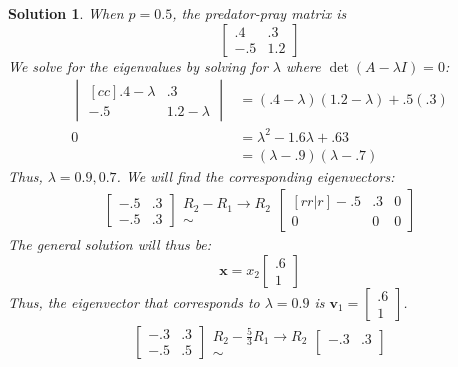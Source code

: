 \documentclass[11pt]{scrartcl}
\theoremstyle{dotlessP}
\newtheorem{sol}{Solution}[section]
\theoremstyle{dotlessN}
\begin{document}
\begin{sol}
	When $p = 0.5$, the predator-pray matrix is
	\[
		\begin{bmatrix}
		.4 & .3 \\
		-.5 & 1.2
		\end{bmatrix}
	\] 
	We solve for the eigenvalues by solving for $\lambda$ where $\det(A - \lambda I) = 0$:
	\begin{align*}
		\begin{vmatrix}[cc]
			.4 - \lambda & .3 \\
			-.5 & 1.2 - \lambda
		\end{vmatrix} &=
		(.4-\lambda)(1.2-\lambda) + .5(.3) \\
		0 &= \lambda^2 -1.6\lambda + .63 \\
		  &= (\lambda - .9)(\lambda - .7)
	\end{align*}
	Thus, $\lambda = 0.9, 0.7$. We will find the corresponding eigenvectors:
	\begin{align*}
		\begin{bmatrix}
		-.5 & .3 \\
		-.5 & .3
		\end{bmatrix}
		\begin{array}{c}
			R_2 - R_1 \to R_2 \\
			\sim
		\end{array}
		\begin{bmatrix}[rr|r]
			-.5 & .3 & 0\\
			0 & 0 & 0
		\end{bmatrix}
	\end{align*}
	The general solution will thus be:
	\[
		\bm{x} = x_2
		\begin{bmatrix}
			.6 \\
			1
		\end{bmatrix}
	\] 
	Thus, the eigenvector that corresponds to $\lambda = 0.9$ is $\bm{v}_1 =
\begin{bmatrix}
	.6 \\
	1
\end{bmatrix}
	$.
\begin{align*}
	\begin{bmatrix}
		-.3 & .3 \\
		-.5 & .5
	\end{bmatrix}	
	\begin{array}{c}
		R_2 - \frac{5}{3}R_1 \to R_2 \\
		\sim
	\end{array}
	\begin{bmatrix}
		-.3 & .3 \\

\end{bmatrix}
\end{align*}
\end{sol}
\end{document}
